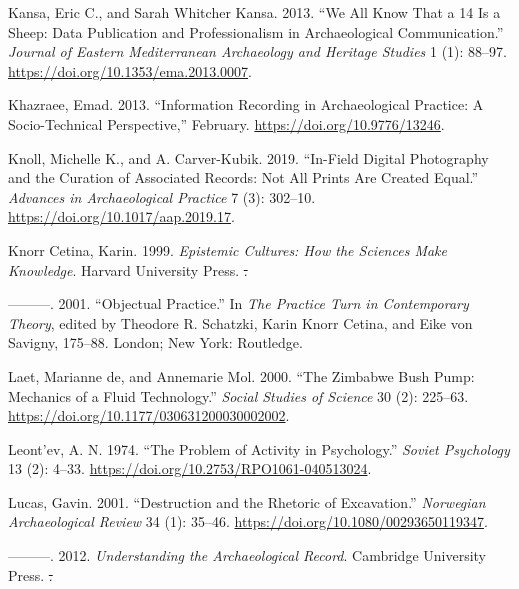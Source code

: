 \documentclass[
]{article}
\makeatletter
\newlength{\cslhangindent}
\newenvironment{CSLReferences}[2] %
 {\begin{list}{}{%
  \setlength{\itemindent}{0pt}
  \setlength{\leftmargin}{0pt}
  \setlength{\parsep}{0pt}
  \ifodd #1
   \setlength{\leftmargin}{\cslhangindent}
   \setlength{\itemindent}{-1\cslhangindent}
  \fi
  \setlength{\itemsep}{#2\baselineskip}}}
 {\end{list}}
\providecommand{\DIFdel}[1]{{\protect\color{red}\sout{#1}}} %
\providecommand{\DIFdelbegin}{} %
\providecommand{\DIFdelend}{} %
\newcommand{\DIFscaledelfig}{0.5}
\newlength{\DIFdelgraphicswidth} %
\newlength{\DIFdelgraphicsheight} %
\newcommand{\DIFdelincludegraphics}[2][]{%
\sbox{\DIFdelgraphicsbox}{\DIFOincludegraphics[#1]{#2}}%
\settoboxwidth{\DIFdelgraphicswidth}{\DIFdelgraphicsbox} %
\settoboxtotalheight{\DIFdelgraphicsheight}{\DIFdelgraphicsbox} %
\scalebox{\DIFscaledelfig}{%
\parbox[b]{\DIFdelgraphicswidth}{\usebox{\DIFdelgraphicsbox}\\[-\baselineskip] \rule{\DIFdelgraphicswidth}{0em}}\llap{\resizebox{\DIFdelgraphicswidth}{\DIFdelgraphicsheight}{%
\setlength{\unitlength}{\DIFdelgraphicswidth}%
\begin{picture}(1,1)%
\thicklines\linethickness{2pt} %
{\color[rgb]{1,0,0}\put(0,0){\framebox(1,1){}}}%
{\color[rgb]{1,0,0}\put(0,0){\line( 1,1){1}}}%
{\color[rgb]{1,0,0}\put(0,1){\line(1,-1){1}}}%
\end{picture}%
}\hspace*{3pt}}} %
} %
\DeclareRobustCommand{\DIFdelbegin}{\DIFOdelbegin \let\includegraphics\DIFdelincludegraphics} %
\DeclareRobustCommand{\DIFdelend}{\DIFOaddend \let\includegraphics\DIFOincludegraphics} %
\let\sout@orig\sout %
\renewcommand{\sout}[1]{\ifmmode\text{\sout@orig{\ensuremath{#1}}}\else\sout@orig{#1}\fi} %
\makeatother
\begin{document}
\begin{CSLReferences}{1}{0}
\DIFdelend {}
Kansa, Eric C., and Sarah Whitcher Kansa. 2013. {``We {All Know That} a
14 {Is} a {Sheep}: {Data Publication} and {Professionalism} in
{Archaeological Communication}.''} \emph{Journal of Eastern
Mediterranean Archaeology and Heritage Studies} 1 (1): 88--97.
\url{https://doi.org/10.1353/ema.2013.0007}.

Khazraee, Emad. 2013. {``Information Recording in Archaeological
Practice: {A} Socio-Technical Perspective,''} February.
\url{https://doi.org/10.9776/13246}.

Knoll, Michelle K., and A. Carver-Kubik. 2019. {``In-{Field Digital
Photography} and the {Curation} of {Associated Records}: {Not All Prints
Are Created Equal}.''} \emph{Advances in Archaeological Practice} 7 (3):
302--10. \url{https://doi.org/10.1017/aap.2019.17}.

Knorr Cetina, Karin. 1999. \emph{Epistemic {Cultures}: {How} the
{Sciences Make Knowledge}}. Harvard University Press.
\DIFdelbegin %
\DIFdel{.
}\DIFdelend 

---------. 2001. {``Objectual Practice.''} In \emph{The {Practice Turn}
in {Contemporary Theory}}, edited by Theodore R. Schatzki, Karin Knorr
Cetina, and Eike von Savigny, 175--88. London; New York: Routledge.

Laet, Marianne de, and Annemarie Mol. 2000. {``The {Zimbabwe Bush Pump}:
{Mechanics} of a {Fluid Technology}.''} \emph{Social Studies of Science}
30 (2): 225--63. \url{https://doi.org/10.1177/030631200030002002}.

Leont'ev, A. N. 1974. {``The {Problem} of {Activity} in {Psychology}.''}
\emph{Soviet Psychology} 13 (2): 4--33.
\url{https://doi.org/10.2753/RPO1061-040513024}.

Lucas, Gavin. 2001. {``Destruction and the {Rhetoric} of
{Excavation}.''} \emph{Norwegian Archaeological Review} 34 (1): 35--46.
\url{https://doi.org/10.1080/00293650119347}.

---------. 2012. \emph{Understanding the {Archaeological Record}}.
Cambridge University Press.
\DIFdelbegin %
\DIFdel{.
}\DIFdelend 


\end{CSLReferences}
\end{document}
